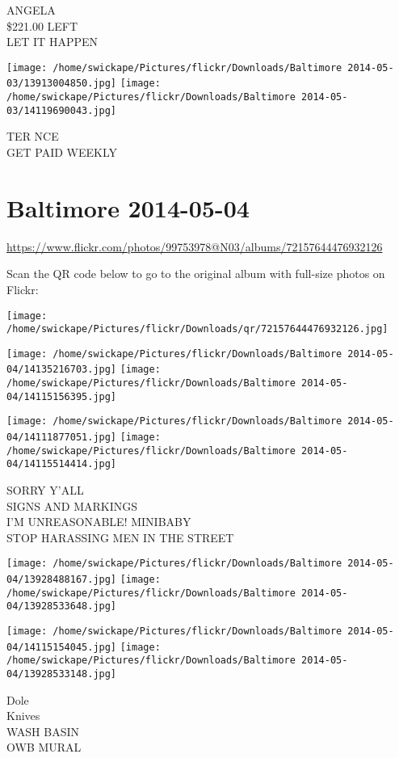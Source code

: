 \documentclass[10pt,letterpaper]{article}
\begin{document}
ANGELA\\
\$221.00 LEFT\\
LET IT HAPPEN
\pagebreak

\texttt{[image: /home/swickape/Pictures/flickr/Downloads/Baltimore 2014-05-03/13913004850.jpg]}
\texttt{[image: /home/swickape/Pictures/flickr/Downloads/Baltimore 2014-05-03/14119690043.jpg]}

TER NCE\\
GET PAID WEEKLY
\pagebreak

\section*{Baltimore 2014-05-04}

\url{https://www.flickr.com/photos/99753978@N03/albums/72157644476932126}

Scan the QR code below to go to the original album with full-size photos on Flickr:

\texttt{[image: /home/swickape/Pictures/flickr/Downloads/qr/72157644476932126.jpg]}
\pagebreak

\texttt{[image: /home/swickape/Pictures/flickr/Downloads/Baltimore 2014-05-04/14135216703.jpg]}
\texttt{[image: /home/swickape/Pictures/flickr/Downloads/Baltimore 2014-05-04/14115156395.jpg]}

\texttt{[image: /home/swickape/Pictures/flickr/Downloads/Baltimore 2014-05-04/14111877051.jpg]}
\texttt{[image: /home/swickape/Pictures/flickr/Downloads/Baltimore 2014-05-04/14115514414.jpg]}

SORRY Y'ALL\\
SIGNS AND MARKINGS\\
I'M UNREASONABLE! MINIBABY\\
STOP HARASSING MEN IN THE STREET
\pagebreak

\texttt{[image: /home/swickape/Pictures/flickr/Downloads/Baltimore 2014-05-04/13928488167.jpg]}
\texttt{[image: /home/swickape/Pictures/flickr/Downloads/Baltimore 2014-05-04/13928533648.jpg]}

\texttt{[image: /home/swickape/Pictures/flickr/Downloads/Baltimore 2014-05-04/14115154045.jpg]}
\texttt{[image: /home/swickape/Pictures/flickr/Downloads/Baltimore 2014-05-04/13928533148.jpg]}

Dole\\
Knives\\
WASH BASIN\\
OWB MURAL
\pagebreak
\end{document}
